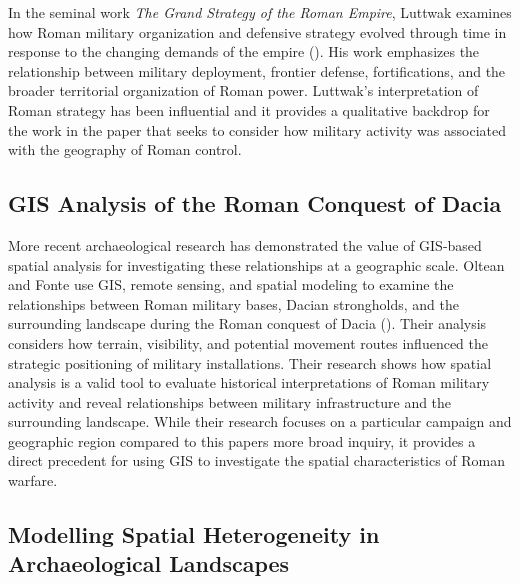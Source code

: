 \documentclass[
  letterpaper,
  DIV=11,
  numbers=noendperiod]{scrartcl}
\begin{document}
In the seminal work \emph{The Grand Strategy of the Roman Empire},
Luttwak examines how Roman military organization and defensive strategy
evolved through time in response to the changing demands of the empire
(). His work emphasizes the
relationship between military deployment, frontier defense,
fortifications, and the broader territorial organization of Roman power.
Luttwak's interpretation of Roman strategy has been influential and it
provides a qualitative backdrop for the work in the paper that seeks to
consider how military activity was associated with the geography of
Roman control.

\subsection{GIS Analysis of the Roman Conquest of
Dacia}\label{gis-analysis-of-the-roman-conquest-of-dacia}

More recent archaeological research has demonstrated the value of
GIS-based spatial analysis for investigating these relationships at a
geographic scale. Oltean and Fonte use GIS, remote sensing, and spatial
modeling to examine the relationships between Roman military bases,
Dacian strongholds, and the surrounding landscape during the Roman
conquest of Dacia ().
Their analysis considers how terrain, visibility, and potential movement
routes influenced the strategic positioning of military installations.
Their research shows how spatial analysis is a valid tool to evaluate
historical interpretations of Roman military activity and reveal
relationships between military infrastructure and the surrounding
landscape. While their research focuses on a particular campaign and
geographic region compared to this papers more broad inquiry, it
provides a direct precedent for using GIS to investigate the spatial
characteristics of Roman warfare.

\subsection{Modelling Spatial Heterogeneity in Archaeological
Landscapes}\label{modelling-spatial-heterogeneity-in-archaeological-landscapes}
\end{document}
